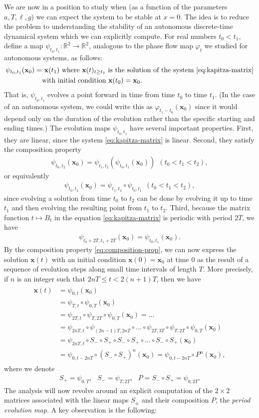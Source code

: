 \documentclass[12pt]{amsart}
\newcommand{\eq}[1]{\begin{equation}\begin{split}#1\end{split}\end{equation}}
\newcommand{\eqst}[1]{\begin{align*}#1\end{align*}}
\newcommand{\R}{\mathbb{R}}
\begin{document}
We are now in a position to study when (as a function of the parameters $a, T, \ell, g$) we can expect the system to be stable at $x=0$. 
The idea is to reduce the problem to understanding the stability of an autonomous discrete-time dynamical system which we can explicitly compute. For real numbers $t_0<t_1$, define a map $\psi_{t_0,t_1}:\R^2\to\R^2$, analogous to the phase flow map $\varphi_t$ we studied for autonomous systems, as follows:
\eqst{
\psi_{t_0,t_1}(\mathbf{x}_0) = &\ \mathbf{x}(t_1)\textrm{ where $\mathbf{x}(t)_{t\ge t_1}$ is the solution of the system \eqref{eq:kapitza-matrix}}\\ & \textrm{with initial condition $\mathbf{x}(t_0)=\mathbf{x}_0$}.
}
That is, $\psi_{t_0,t_1}$ evolves a point forward in time from time $t_0$ to time $t_1$. (In the case of an autonomous system, we could write this as $\varphi_{t_1-t_0}(\mathbf{x}_0)$ since it would depend only on the duration of the evolution rather than the specific starting and ending times.) The evolution maps $\psi_{t_0,t_1}$ have several important properties. First, they are linear, since the system \eqref{eq:kapitza-matrix} is linear. Second, they satisfy the composition property
\eqst{
\psi_{t_0,t_2}(\mathbf{x}_0) = \psi_{t_1,t_2}( \psi_{t_0,t_1}(\mathbf{x}_0)) \ \ (t_0<t_1<t_2),
}
or equivalently
\eq{ \label{eq:composition-prop}
\psi_{t_0,t_2}(\mathbf{x}_0) = \psi_{t_1,t_2}\circ \psi_{t_0,t_1}\ \ (t_0<t_1<t_2),
}
since evolving a solution from time $t_0$ to $t_2$ can be done by evolving it up to time $t_1$ and then evolving the resulting point from $t_1$ to $t_2$. Third, because the matrix function $t\mapsto B_t$ in the equation \eqref{eq:kapitza-matrix} is periodic with period $2T$, we have
\eqst{
\psi_{t_0+2T,t_1+2T}(\mathbf{x}_0) = \psi_{t_0,t_1}(\mathbf{x}_0).
}
By the composition property \eqref{eq:composition-prop}, we can now express the solution $\mathbf{x}(t)$ with an initial condition $\mathbf{x}(0)=\mathbf{x}_0$ at time $0$ as the result of a sequence of evolution steps along small time intervals of length $T$. More precisely, if $n$ is an integer such that $2nT \le t < 2(n+1)T$, then we have
\eq{
\begin{split}
\mathbf{x}(t) &= \psi_{0,t}(\mathbf{x}_0)
\\ &=
\psi_{T,t} \circ \psi_{0,T}(\mathbf{x}_0)
\\ &=
\psi_{2T,t} \circ \psi_{T,2T}\circ \psi_{0,T}(\mathbf{x}_0) =  \ldots 
\\ &= 
\psi_{2nT, t} \circ \psi_{(2n-1)T,2nT} \circ \ldots
\circ \psi_{2T,3T} \circ \psi_{T,2T}\circ \psi_{0,T}(\mathbf{x}_0)
\\ &=
\psi_{2nT, t} \circ S_- \circ S_+ \circ S_- \circ S_+ \circ \ldots \circ S_- \circ S_+ (\mathbf{x}_0)
\\ &=
\psi_{0, t-2nT} \circ (S_- \circ S_+)^n (\mathbf{x}_0) = \psi_{0, t-2nT} \circ P^n (\mathbf{x}_0),
\end{split}
\label{eq:kapitza-phase-flow}
}
where we denote
\eqst{
S_+ = \psi_{0,T}, \ \ \ S_- = \psi_{T,2T}, \ \ \ P= S_- \circ S_+ = \psi_{0,2T}.
}
The analysis will now revolve around an explicit computation of the $2\times 2$ matrices associated with the linear maps $S_\pm$ and their composition $P$, the \emph{period evolution map}. A key observation is the following:
\end{document}
